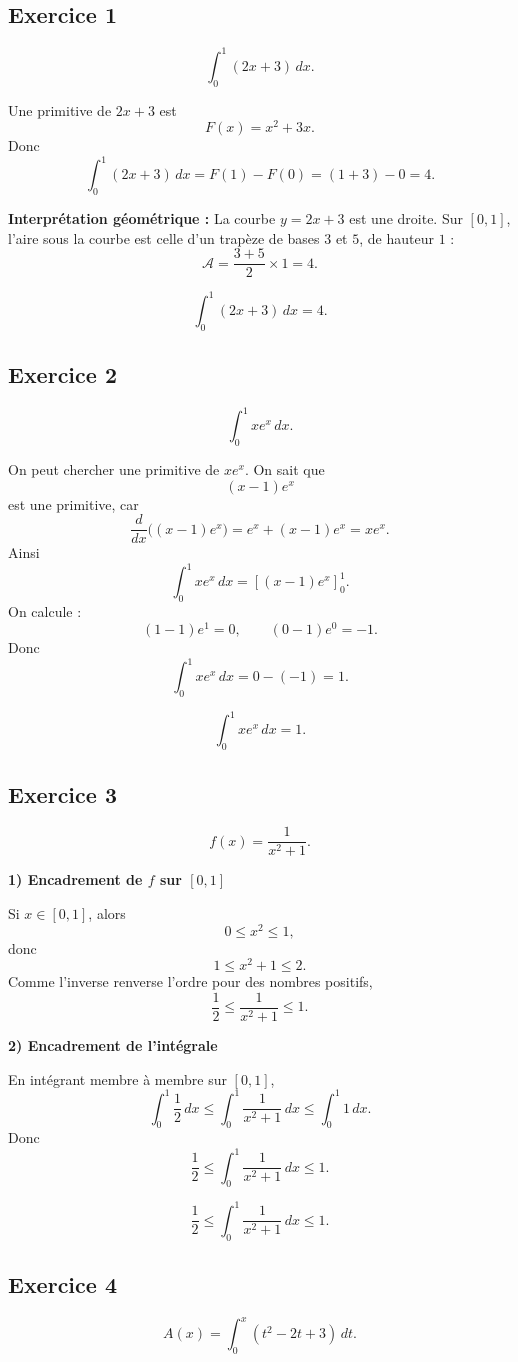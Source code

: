 \documentclass[11pt,a4paper]{article}
\begin{document}
\subsection*{Exercice 1}
\[
\int_0^1 (2x+3)\,dx.
\]

Une primitive de \(2x+3\) est
\[
F(x)=x^2+3x.
\]
Donc
\[
\int_0^1 (2x+3)\,dx=F(1)-F(0)=(1+3)-0=4.
\]

\textbf{Interprétation géométrique :}  
La courbe \(y=2x+3\) est une droite. Sur \([0,1]\), l'aire sous la courbe est celle d'un trapèze de bases \(3\) et \(5\), de hauteur \(1\) :
\[
\mathcal{A}=\frac{3+5}{2}\times 1=4.
\]

\[
\boxed{\int_0^1 (2x+3)\,dx=4.}
\]

\subsection*{Exercice 2}
\[
\int_0^1 xe^x\,dx.
\]

On peut chercher une primitive de \(xe^x\).  
On sait que
\[
(x-1)e^x
\]
est une primitive, car
\[
\frac{d}{dx}\big((x-1)e^x\big)=e^x+(x-1)e^x=xe^x.
\]
Ainsi
\[
\int_0^1 xe^x\,dx=\left[(x-1)e^x\right]_0^1.
\]
On calcule :
\[
(1-1)e^1=0,\qquad (0-1)e^0=-1.
\]
Donc
\[
\int_0^1 xe^x\,dx=0-(-1)=1.
\]

\[
\boxed{\int_0^1 xe^x\,dx=1.}
\]

\subsection*{Exercice 3}
\[
f(x)=\frac1{x^2+1}.
\]

\textbf{1) Encadrement de \(f\) sur \([0,1]\)}

Si \(x\in[0,1]\), alors
\[
0\leq x^2\leq 1,
\]
donc
\[
1\leq x^2+1\leq 2.
\]
Comme l'inverse renverse l'ordre pour des nombres positifs,
\[
\frac12\leq \frac1{x^2+1}\leq 1.
\]

\textbf{2) Encadrement de l'intégrale}

En intégrant membre à membre sur \([0,1]\),
\[
\int_0^1 \frac12\,dx \leq \int_0^1 \frac1{x^2+1}\,dx \leq \int_0^1 1\,dx.
\]
Donc
\[
\frac12 \leq \int_0^1 \frac1{x^2+1}\,dx \leq 1.
\]

\[
\boxed{\frac12 \leq \int_0^1 \frac1{x^2+1}\,dx \leq 1.}
\]

\subsection*{Exercice 4}
\[
A(x)=\int_0^x (t^2-2t+3)\,dt.
\]
\end{document}

